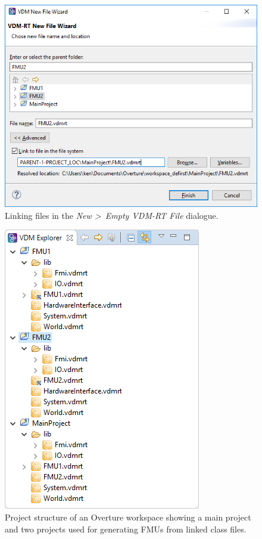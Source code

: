 \begin{figure}
\centering
\includegraphics[scale=0.8]{figures/defirst_link}
\caption{Linking files in the \emph{New \textgreater\ Empty VDM-RT File} dialogue.}
\label{fig:defirst_link}
\end{figure}

\begin{figure}
\centering
\includegraphics[scale=0.8]{figures/defirst_workspace}
\caption{Project structure of an Overture workspace showing a main project and two projects used for generating FMUs from linked class files.}
\label{fig:defirst_workspace}
\end{figure}

